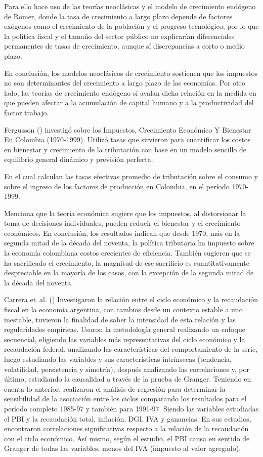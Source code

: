 \documentclass[
  jou,
  floatsintext,
  longtable,
  a4paper,
  nolmodern,
  notxfonts,
  notimes,
  12pt,
  colorlinks=true,linkcolor=blue,citecolor=blue,urlcolor=blue]{apa7}
\begin{document}
Para ello hace uso de las teorías neoclásicas y el modelo de crecimiento
endógeno de Romer, donde la tasa de crecimiento a largo plazo depende de
factores exógenos como el crecimiento de la población y el progreso
tecnológico, por lo que la política fiscal y el tamaño del sector
público no explicarían diferenciales permanentes de tasas de
crecimiento, aunque sí discrepancias a corto o medio plazo.

En conclusión, los modelos neoclásicos de crecimiento sostienen que los
impuestos no son determinantes del crecimiento a largo plazo de las
economías. Por otro lado, las teorías de crecimiento endógeno sí avalan
dicha relación en la medida en que pueden afectar a la acumulación de
capital humano y a la productividad del factor trabajo.

Fergusson () investigó
sobre los Impuestos, Crecimiento Económico Y Bienestar En Colombia
(1970-1999). Utilizó tasas que sirvieron para cuantificar los costos en
bienestar y crecimiento de la tributación con base en un modelo sencillo
de equilibrio general dinámico y previsión perfecta.

En el cual calculan las tasas efectivas promedio de tributación sobre el
consumo y sobre el ingreso de los factores de producción en Colombia, en
el período 1970-1999.

Menciona que la teoría económica sugiere que los impuestos, al
distorsionar la toma de decisiones individuales, pueden reducir el
bienestar y el crecimiento económicos. En conclusión, los resultados
indican que desde 1970, más en la segunda mitad de la década del
noventa, la política tributaria ha impuesto sobre la economía colombiana
costos crecientes de eficiencia. También sugieren que se ha sacrificado
el crecimiento, la magnitud de ese sacrificio es cuantitativamente
despreciable en la mayoría de los casos, con la excepción de la segunda
mitad de la década del noventa.

Carrera et~al. () Investigaron la
relación entre el ciclo económico y la recaudación fiscal en la economía
argentina, con cambios desde un contexto estable a uno inestable,
tuvieron la finalidad de saber la intensidad de esta relación y las
regularidades empíricas. Usaron la metodología general realizando un
enfoque secuencial, eligiendo las variables más representativas del
ciclo económico y la recaudación federal, analizando las características
del comportamiento de la serie, luego estudiando las variables y sus
características intrínsecas (tendencia, volatilidad, persistencia y
simetría), después analizando las correlaciones y, por último,
estudiando la causalidad a través de la prueba de Granger. Teniendo en
cuenta lo anterior, realizaron el análisis de regresión para determinar
la sensibilidad de la asociación entre los ciclos comparando los
resultados para el período completo 1985-97 y también para 1991-97.
Siendo las variables estudiadas el PBI y la recaudación total,
inflación, DGI, IVA y ganancias. En sus estudios, encontraron
correlaciones significativas respecto a la relación de la recaudación
con el ciclo económico. Así mismo, según el estudio, el PBI causa en
sentido de Granger de todas las variables, menos del IVA (impuesto al
valor agregado).
\end{document}
